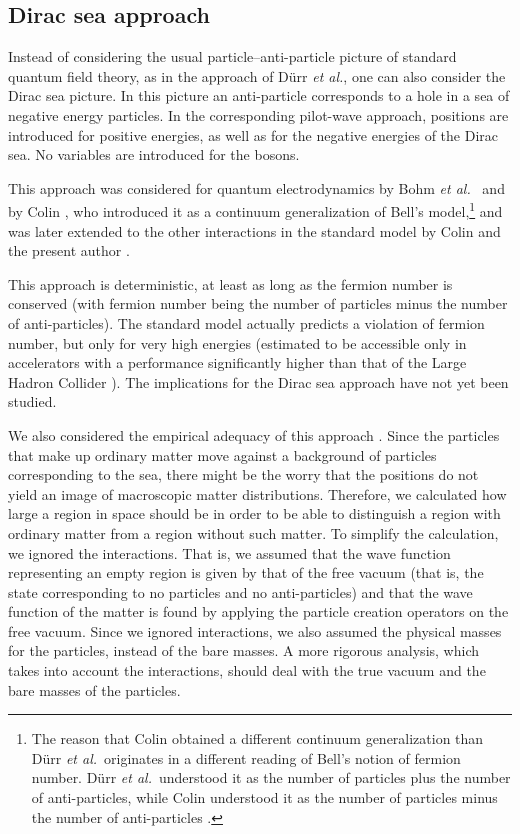 \documentclass[12pt]{article}
\begin{document}
\subsection{Dirac sea approach}
Instead of considering the usual particle--anti-particle picture of standard quantum field theory, as in the approach of D\"urr {\em et al.}, one can also consider the Dirac sea picture. In this picture an anti-particle corresponds to a hole in a sea of negative energy particles. In the corresponding pilot-wave approach, positions are introduced for positive energies, as well as for the negative energies of the Dirac sea. No variables are introduced for the bosons. 

This approach was considered for quantum electrodynamics by Bohm {\em et al.}\ \cite{bohm87b,bohm93} and by Colin \cite{colin03b,colin03c}, who introduced it as a continuum generalization of Bell's model,{\footnote{The reason that Colin obtained a different continuum generalization than D\"urr {\em et al.}\ originates in a different reading of Bell's notion of fermion number. D\"urr {\em et al.}\  understood it as the number of particles plus the number of anti-particles, while Colin understood it as the number of particles minus the number of anti-particles \cite{colin07}.}} and was later extended to the other interactions in the standard model by Colin and the present author \cite{colin07}. 

This approach is deterministic, at least as long as the fermion number is conserved (with fermion number being the number of particles minus the number of anti-particles). The standard model actually predicts a violation of fermion number, but only for very high energies (estimated to be accessible only in accelerators with a performance significantly higher than that of the  Large Hadron Collider \cite{colin07}). The implications for the Dirac sea approach have not yet been studied.

We also considered the empirical adequacy of this approach \cite{colin07}. Since the particles that make up ordinary matter move against a background of particles corresponding to the sea, there might be the worry that the positions do not yield an image of macroscopic matter distributions. Therefore, we calculated how large a region in space should be in order to be able to distinguish a region with ordinary matter from a region without such matter. To simplify the calculation, we ignored the interactions. That is, we assumed that the wave function representing an empty region is given by that of the free vacuum (that is, the state corresponding to no particles and no anti-particles) and that the wave function of the matter is found by applying the particle creation operators on the free vacuum. Since we ignored interactions, we also assumed the physical masses for the particles, instead of the bare masses. A more rigorous analysis, which takes into account the interactions, should deal with the true vacuum and the bare masses of the particles. 
\end{document}
